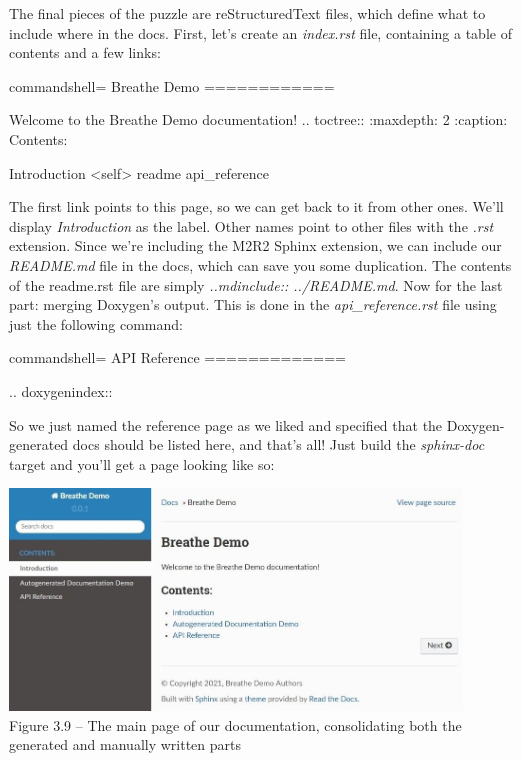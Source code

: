 The final pieces of the puzzle are reStructuredText files, which define what to include where in the docs. First, let's create an \textit{index.rst} file, containing a table of contents and a few links:


\begin{tcblisting}{commandshell={}}
Breathe Demo
============

Welcome to the Breathe Demo documentation!
.. toctree::
    :maxdepth: 2
    :caption: Contents:
   
Introduction <self>
    readme
    api_reference
\end{tcblisting}

The first link points to this page, so we can get back to it from other ones. We'll display \textit{Introduction} as the label. Other names point to other files with the \textit{.rst} extension. Since we're including the M2R2 Sphinx extension, we can include our \textit{README.md} file in the docs, which can save you some duplication. The contents of the readme.rst file are simply \textit{..mdinclude:: ../README.md}. Now for the last part: merging Doxygen's output. This is done in the \textit{api\_reference.rst} file using just the following command:

\begin{tcblisting}{commandshell={}}
API Reference
=============

.. doxygenindex::

\end{tcblisting}

So we just named the reference page as we liked and specified that the Doxygen-generated docs should be listed here, and that's all! Just build the \textit{sphinx-doc} target and you'll get a page looking like so:


\begin{center}
\includegraphics[width=0.9\textwidth]{content/1/chapter3/images/9.jpg}\\
Figure 3.9 – The main page of our documentation, consolidating both the generated and manually written parts
\end{center}


